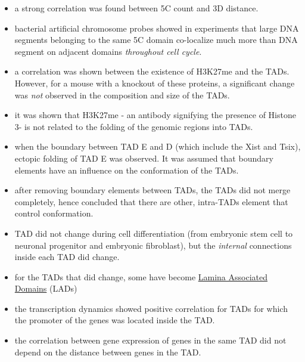\documentclass[12pt]{book}
\begin{document}
\begin{itemize}
\item a strong correlation was found between 5C count and 3D distance. 
\item bacterial artificial chromosome probes showed in experiments that large DNA segments belonging to the same 5C domain co-localize much more than DNA segment on adjacent domains \textit{throughout cell cycle}. 
\item a correlation was shown between the existence of H3K27me and the TADs. However, for a mouse with a knockout of these proteins, a significant change was \textit{not} observed in the composition and size of the TADs.
\item it was shown that H3K27me - an antibody signifying the presence of Histone 3- is not related to the folding of the genomic regions into TADs. 
\item when the boundary between TAD E and D (which include the Xist and Tsix), ectopic folding of TAD E was observed. It was assumed that boundary elements have an influence on the conformation of the TADs. 
\item after removing boundary elements between TADs, the TADs did not merge completely, hence concluded that there are other, intra-TADs element that control conformation.
\item TAD did not change during cell differentiation (from embryonic stem cell to neuronal progenitor and embryonic fibroblast), but the \textit{internal} connections inside each TAD did change.
\item for the TADs that did change, some have become \href{http://www.nature.com/nature/journal/v453/n7197/full/nature06947.html}{Lamina Associated Domains} (LADs) 
\item the transcription dynamics showed positive correlation for TADs for which the promoter of the genes was located inside the TAD. 
\item the correlation between gene expression of genes in the same TAD did not depend on the distance between genes in the TAD. 
\end{itemize}
\end{document}
